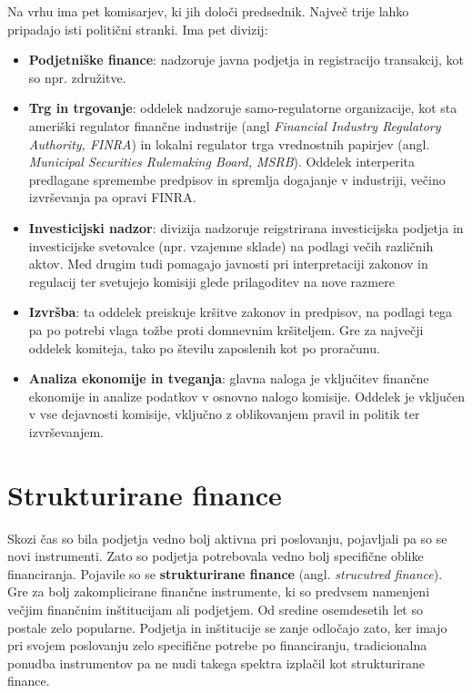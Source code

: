 \documentclass[12pt,a4paper]{amsart}
\theoremstyle{definition} %
\theoremstyle{plain} %
\begin{document}
Na vrhu ima pet komisarjev, ki jih določi predsednik. Največ trije lahko pripadajo isti 
politični stranki. Ima pet divizij: 
\begin{itemize}
  \item \textbf{Podjetniške finance}: nadzoruje javna podjetja in registracijo 
	transakcij, kot so npr. združitve.
  \item \textbf{Trg in trgovanje}: oddelek nadzoruje samo-regulatorne organizacije, 
	kot sta ameriški regulator finančne industrije (angl \textit{Financial Industry 
	Regulatory Authority, FINRA}) in lokalni regulator trga vrednostnih papirjev 
	(angl. \textit{Municipal Securities Rulemaking Board, MSRB}). Oddelek interperita 
	predlagane spremembe predpisov in spremlja dogajanje v industriji, večino 
	izvrševanja pa opravi FINRA.
  \item \textbf{Investicijski nadzor}: divizija nadzoruje reigstrirana investicijska 
	podjetja in investicijske svetovalce (npr. vzajemne sklade) na podlagi 
	večih različnih aktov. Med drugim tudi pomagajo javnosti pri interpretaciji 
	zakonov in regulacij ter svetujejo komisiji glede prilagoditev na nove 
	razmere
  \item \textbf{Izvršba}: ta oddelek preiskuje kršitve zakonov in predpisov, na 
	podlagi tega pa po potrebi vlaga tožbe proti domnevnim kršiteljem. Gre za 
	največji oddelek komiteja, tako po številu zaposlenih kot po proračunu. 
  \item \textbf{Analiza ekonomije in tveganja}: glavna naloga je vključitev finančne 
	ekonomije in analize podatkov v osnovno nalogo komisije. Oddelek je vključen 
	v vse dejavnosti komisije, vključno z oblikovanjem pravil in politik ter izvrševanjem.
\end{itemize}


\section{Strukturirane finance}
Skozi čas so bila podjetja vedno bolj aktivna pri poslovanju, pojavljali pa so se novi 
instrumenti. Zato so podjetja potrebovala vedno bolj specifične oblike financiranja. Pojavile 
so se \textbf{strukturirane finance} (angl. \textit{strucutred finance}). Gre za bolj 
zakomplicirane finančne instrumente, ki so predvsem namenjeni večjim finančnim 
inštitucijam ali podjetjem. Od sredine osemdesetih let so postale zelo popularne. 
Podjetja in inštitucije se zanje odločajo zato, ker imajo pri svojem poslovanju zelo 
specifične potrebe po financiranju, tradicionalna ponudba instrumentov pa ne nudi 
takega spektra izplačil kot strukturirane finance. 
\end{document}
